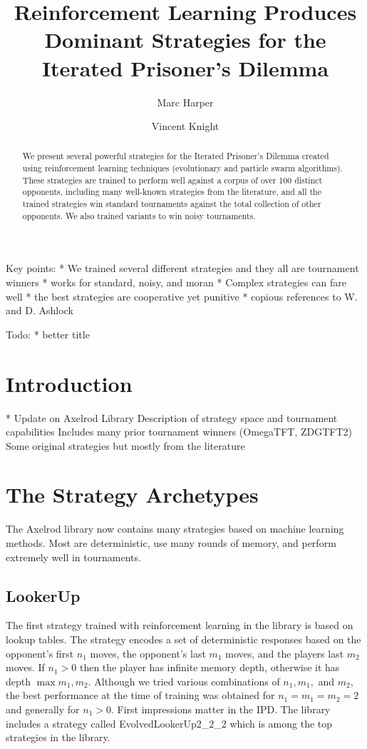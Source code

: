 \documentclass{article}
\title{Reinforcement Learning Produces Dominant Strategies for the
Iterated Prisoner's Dilemma}
\author{Marc Harper \and Vincent Knight} %
\date{}
\begin{document}
\maketitle

Key points:
* We trained several different strategies and they all are tournament
winners
* works for standard, noisy, and moran
* Complex strategies can fare well
* the best strategies are cooperative yet punitive
* copious references to W. and D. Ashlock

Todo:
* better title


\begin{abstract}
    We present several powerful strategies for the Iterated
    Prisoner's Dilemma created using reinforcement learning techniques
    (evolutionary and particle swarm algorithms). These strategies are
    trained to perform well against a corpus of over 100 distinct
    opponents, including many well-known strategies from the literature, and all
    the trained strategies win standard tournaments against the total collection
    of other opponents. We also trained variants to win noisy tournaments.
\end{abstract}

\section{Introduction}\label{sec:introduction}

* Update on Axelrod Library
Description of strategy space and tournament capabilities
Includes many prior tournament winners (OmegaTFT, ZDGTFT2)
Some original strategies but mostly from the literature


\section{The Strategy Archetypes}

The Axelrod library now contains many strategies based on machine learning
methods. Most are deterministic, use many rounds of memory, and perform
extremely well in tournaments.

\subsection{LookerUp}

The first strategy trained with reinforcement learning in the library is based
on lookup tables. The strategy encodes a set of deterministic responses
based on the opponent's first $n_1$ moves, the opponent's last $m_1$ moves, and
the players last $m_2$ moves. If $n_1 > 0$ then the player has infinite memory
depth, otherwise it has depth $\max{m_1, m_2}$. Although we tried various
combinations of $n_1, m_1,$ and $m_2$, the best performance at the time of
training was obtained for $n_1 = m_1 = m_2 = 2$ and generally for $n_1 > 0$.
First impressions matter in the IPD. The library includes a strategy
called EvolvedLookerUp2_2_2 which is among the top strategies in the library.
\end{document}
